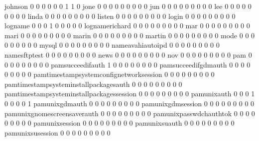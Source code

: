 \documentclass[compress,8pt]{beamer}
\begin{document}
\begin{frame}
\begin{Schunk}
  johnson                                    0   0   0   0   0   0   1   1   0
  jone                                       0   0   0   0   0   0   0   0   0
  jun                                        0   0   0   0   0   0   0   0   0
  lee                                        0   0   0   0   0   0   0   0   0
  linda                                      0   0   0   0   0   0   0   0   0
  listen                                     0   0   0   0   0   0   0   0   0
  login                                      0   0   0   0   0   0   0   0   0
  logname                                    0   0   0   1   0   0   0   0   0
  lognamerichard                             0   0   0   0   0   0   0   0   0
  mar                                        0   0   0   0   0   0   0   0   0
  mari                                       0   0   0   0   0   0   0   0   0
  marin                                      0   0   0   0   0   0   0   0   0
  martin                                     0   0   0   0   0   0   0   0   0
  mode                                       0   0   0   0   0   0   0   0   0
  mysql                                      0   0   0   0   0   0   0   0   0
  nameavahiautoipd                           0   0   0   0   0   0   0   0   0
  namesftptest                               0   0   0   0   0   0   0   0   0
  news                                       0   0   0   0   0   0   0   0   0
  nov                                        0   0   0   0   0   0   0   0   0
  pam                                        0   0   0   0   0   0   0   0   0
  pamsucceedifauth                           1   0   0   0   0   0   0   0   0
  pamsucceedifgdmauth                        0   0   0   0   0   0   0   0   0
  pamtimestampsystemconfignetworksession     0   0   0   0   0   0   0   0   0
  pamtimestampsysteminstallpackagesauth      0   0   0   0   0   0   0   0   0
  pamtimestampsysteminstallpackagessession   0   0   0   0   0   0   0   0   0
  pamunixauth                                0   0   0   1   0   0   0   0   1
  pamunixgdmauth                             0   0   0   0   0   0   0   0   0
  pamunixgdmsession                          0   0   0   0   0   0   0   0   0
  pamunixgnomescreensaverauth                0   0   0   0   0   0   0   0   0
  pamunixpasswdchauthtok                     0   0   0   0   0   0   0   0   0
  pamunixsession                             0   0   0   0   0   0   0   0   0
  pamunixsuauth                              0   0   0   0   0   0   0   0   0
  pamunixsusession                           0   0   0   0   0   0   0   0   0

\end{Schunk}
\end{frame}
\end{document}
